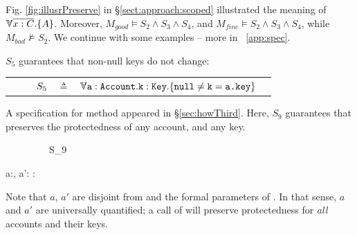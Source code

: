 Fig. \ref{fig:illusrPreserve} in  \S \ref{sect:approach:scoped}  illustrated  the meaning of ${\TwoStatesN {\overline {x:C}} {A}}$. 
Moreover, $M_{good} \models S_2 \wedge S_3 \wedge S_4$, and  $M_{fine} \models S_2 \wedge S_3 \wedge S_4$,
 while $M_{bad} \not\models S_2$.
We continue with some examples -- more in %
\A ~\ref{app:spec}.

{
 \begin{example}
 \label{example:twostate}
 $S_5$  guarantees   that   non-null keys do not change:
 \\
 \begin{tabular}{lcll}
$\strut \ \ \ \ \ \ \ \ S_5$ & $\triangleq$   & ${\TwoStatesN {\prg{a}:\prg{Account}.\prg{k}:\prg{Key}}  {\prg{null}\neq \prg{k}=\prg{a.\password}}} $  \end{tabular}
 \end{example} 
 }


 
 \begin{example}
 \label{example:mprepostl}
 A specification for method  appeared in \S\ref{sec:howThird}. 
Here,  $S_9$    guarantees that  preserves the protectedness of any account, and any key. %

   {\sprepost
		{\strut \ \ \ \ \ \ \ \ \ S_9} 
		{  a:, a':\wedge  {}\wedge  {} }
		{} {} {:}
		{   \wedge  {}  }
		{   \wedge  {} }
}

Note that %
$a$, $a'$ are disjoint from  and the formal parameters of . 
In that sense, $a$ and $a'$ are universally quantified; a call of  will preserve protectedness for \emph{ all} accounts and their keys. %

\end{example}





